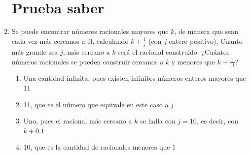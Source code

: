 \documentclass[fleqn]{article}
\begin{document}
\begin{enumerate}
  \section*{Prueba saber}
 \item Se puede encontrar números racionales mayores que $k$, de manera que sean cada vez más cercanos a él, calculando $k +\frac{1}{j}$ (con $j$ entero positivo). Cuanto más grande sea $j$, más cercano a $k$ será el racional construido. ¿Cuántos números racionales se pueden construir cercanos a $k$ y menores que $k + \frac{1}{11}$?
\begin{enumerate}
\item Una cantidad infinita, pues existen infinitos números enteros mayores que 11
\item 11, que es el número que equivale en este caso a $j$
\item Uno, pues el racional más cercano a $k$ se halla con $j=10$, es decir, con $k+0.1$
\item 10, que es la cantidad de racionales menores que 1
\end{enumerate}
 \end{enumerate}
\end{document}
